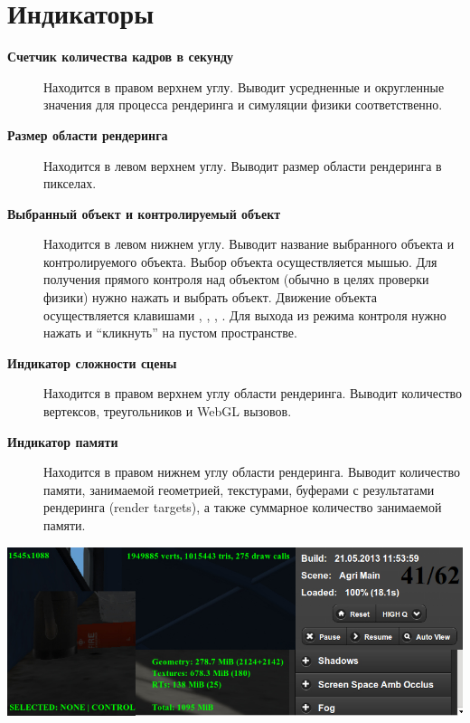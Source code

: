 \documentclass[a4paper,12pt,oneside]{sphinxmanual}
\begin{document}
\section{Индикаторы}
\label{viewer:id4}\begin{description}
\item[{\textbf{Счетчик количества кадров в секунду}}] \leavevmode
Находится в правом верхнем углу. Выводит усредненные и округленные значения для процесса рендеринга и симуляции физики соответственно.

\item[{\textbf{Размер области рендеринга}}] \leavevmode
Находится в левом верхнем углу. Выводит размер области рендеринга в пикселах.

\item[{\textbf{Выбранный объект и контролируемый объект}}] \leavevmode
Находится в левом нижнем углу. Выводит название выбранного объекта и контролируемого объекта. Выбор объекта осуществляется мышью. Для получения прямого контроля над объектом (обычно в целях проверки физики) нужно нажать  и выбрать объект. Движение объекта осуществляется клавишами , , , . Для выхода из режима контроля нужно нажать  и ``кликнуть'' на пустом пространстве.

\item[{\textbf{Индикатор сложности сцены}}] \leavevmode
Находится в правом верхнем углу области рендеринга. Выводит количество вертексов, треугольников и WebGL вызовов.

\item[{\textbf{Индикатор памяти}}] \leavevmode
Находится в правом нижнем углу области рендеринга. Выводит количество памяти, занимаемой геометрией, текстурами, буферами с результатами рендеринга (render targets), а также суммарное количество занимаемой памяти.

\end{description}

{\hfill\includegraphics[width=1.000\linewidth]{indicators.jpg}\hfill}
\end{document}
